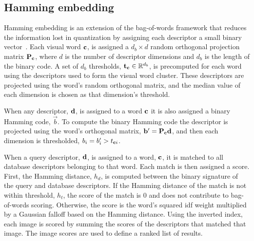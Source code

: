     \subsection{Hamming embedding}
        Hamming embedding is an extension of the bag-of-words framework
          that reduces the information lost in quantization by assigning
          each descriptor a small binary vector~\cite{jegou_hamming_2008,
          jegou_burstiness_2009, jegou_improving_2010}.
        Each visual word $\mathbf{c}$, is assigned a $d_b \times d$ random
          orthogonal projection matrix $\mathbf{P}_{\mathbf{c}}$, where $d$ is the
          number of descriptor dimensions and $d_b$ is the length of the
          binary code.
        A set of $d_b$ thresholds, $\mathbf{t}_{\mathbf{c}} \in \mathbb{R}^{d_b}$, is
          precomputed for each word using the descriptors used to form
          the visual word cluster.
        These descriptors are projected using the word's random
          orthogonal matrix, and the median value of each dimension is
          chosen as that dimension's threshold.

        When any descriptor, $\mathbf{d}$, is assigned to a word $\mathbf{c}$ it is also
          assigned a binary Hamming code, $\vec{b}$.
        To compute the binary Hamming code the descriptor is projected using
          the word's orthogonal matrix, $\mathbf{b}' = \mathbf{P}_{\mathbf{c}} \mathbf{d}$, and then
          each dimension is thresholded, $b_i = b'_i > t_{\mathbf{c}{}i}$.

        When a query descriptor, $\mathbf{d}$, is assigned to a word, $\mathbf{c}$,
          it is matched to all database descriptors belonging to that
          word.
        Each match is then assigned a score.
        First, the Hamming distance, $h_d$, is computed between the
          binary signature of the query and database descriptors.
        If the Hamming distance of the match is not within threshold,
          $h_t$, the score of the match is $0$ and does not contribute to
          bag-of-words scoring.
        Otherwise, the score is the word's squared idf weight
          multiplied by a Gaussian falloff based on the Hamming distance.
        Using the inverted index, each image is scored by summing the
          scores of the descriptors that matched that image.
        The image scores are used to define a ranked list of results.

